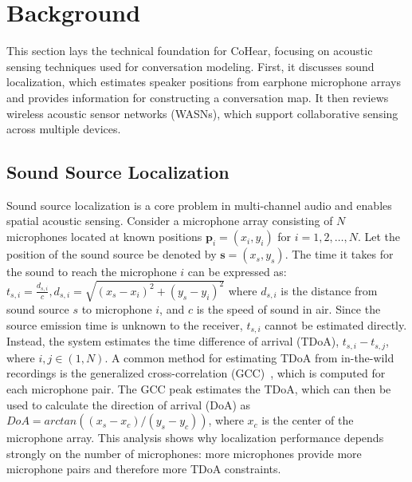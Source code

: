 \section{Background}
\label{sec:cohear_background}

This section lays the technical foundation for CoHear, focusing on acoustic sensing techniques used for conversation modeling.
First, it discusses sound localization, which estimates speaker positions from earphone microphone arrays and provides information for constructing a conversation map.
It then reviews wireless acoustic sensor networks (WASNs), which support collaborative sensing across multiple devices.


\subsection{Sound Source Localization}
Sound source localization is a core problem in multi-channel audio and enables spatial acoustic sensing.
Consider a microphone array consisting of $N$ microphones located at known positions $\mathbf{p}_i = (x_i, y_i)$ for $i = 1, 2, \ldots, N$. Let the position of the sound source be denoted by $\mathbf{s} = (x_s, y_s)$.
The time it takes for the sound to reach the microphone $i$ can be expressed as:
\(t_{s, i} = \frac{d_{s, i}}{c}, d_{s, i} = \sqrt{(x_s - x_i)^2 + (y_s - y_i)^2}\)
where $d_{s, i}$ is the distance from sound source $s$ to microphone $i$, and $c$ is the speed of sound in air. Since the source emission time is unknown to the receiver, $t_{s, i}$ cannot be estimated directly. Instead, the system estimates the time difference of arrival (TDoA), $t_{s, i} - t_{s, j}$, where $i, j \in (1, N)$. A common method for estimating TDoA from in-the-wild recordings is the generalized cross-correlation (GCC)~\cite{knapp1976generalized}, which is computed for each microphone pair. The GCC peak estimates the TDoA, which can then be used to calculate the direction of arrival (DoA) as \(DoA = arctan((x_s - x_c)/(y_s - y_c))\), where $x_c$ is the center of the microphone array. This analysis shows why localization performance depends strongly on the number of microphones: more microphones provide more microphone pairs and therefore more TDoA constraints.

